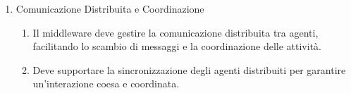 \begin{enumerate}
    \item  Comunicazione Distribuita e Coordinazione
          \begin{enumerate}
              \item  Il middleware deve gestire la comunicazione distribuita tra agenti, facilitando
                    lo scambio di messaggi e la coordinazione delle attività.
              \item Deve supportare la sincronizzazione degli agenti distribuiti per garantire
                    un'interazione coesa e coordinata.
          \end{enumerate}
\end{enumerate}


